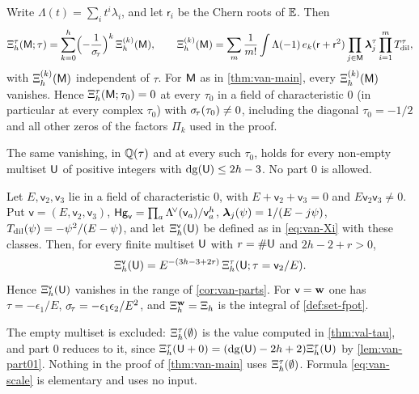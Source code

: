 \begin{cor}\label{cor:van-spec}
Write $\Lambda(t)=\sum_i t^i\lambda_i$, and let $\mathsf{r}_i$ be the Chern roots of $\mathbb{E}$. Then
\[
\Xi^{\tau}_h(\mathsf{M};\tau)=\sum_{k=0}^h\Bigl(-\frac{1}{\sigma_{\!\tau}}\Bigr)^{k}\,\Xi^{(k)}_h(\mathsf{M}),\qquad
\Xi^{(k)}_h(\mathsf{M})=\sum_m\frac{1}{m!}\int\Lambda(-1)\,e_k(\mathsf{r}+\mathsf{r}^2)\prod_{j\in\mathsf{M}}\boldsymbol{\lambda}^{\tau}_j\prod_{i=1}^mT_{\mathrm{dil}}^{\tau},
\]
with $\Xi^{(k)}_h(\mathsf{M})$ independent of $\tau$. For $\mathsf{M}$ as in \cref{thm:van-main}, every $\Xi^{(k)}_h(\mathsf{M})$ vanishes. Hence $\Xi^{\tau}_h(\mathsf{M};\tau_0)=0$ at every $\tau_0$ in a field of characteristic $0$ (in particular at every complex $\tau_0$) with $\sigma_{\!\tau}(\tau_0)\neq 0$, including the diagonal $\tau_0=-1/2$ and all other zeros of the factors $\Pi_k$ used in the proof.
\end{cor}

\begin{cor}\label{cor:van-parts}
The same vanishing, in $\mathbb{Q}(\tau)$ and at every such $\tau_0$, holds for every non-empty multiset $\mathsf{U}$ of positive integers with $\mathrm{dg}(\mathsf{U})\leq 2h-3$. No part $0$ is allowed.
\end{cor}

\begin{cor}\label{cor:van-scale}
Let $E,\mathsf{v}_2,\mathsf{v}_3$ lie in a field of characteristic $0$, with $E+\mathsf{v}_2+\mathsf{v}_3=0$ and $E\mathsf{v}_2\mathsf{v}_3\neq 0$. Put $\mathsf{v}=(E,\mathsf{v}_2,\mathsf{v}_3)$, $\mathsf{Hg}_{\mathsf{v}}=\prod_a\Lambda^{\!\vee}(\mathsf{v}_a)/\mathsf{v}_a^h$, $\boldsymbol{\lambda}_j(\psi)=1/(E-j\psi)$, $T_{\mathrm{dil}}(\psi)=-\psi^2/(E-\psi)$, and let $\Xi^{\mathsf{v}}_h(\mathsf{U})$ be defined as in \eqref{eq:van-Xi} with these classes. Then, for every finite multiset $\mathsf{U}$ with $r=\#\mathsf{U}$ and $2h-2+r>0$,
\begin{equation}\label{eq:van-scale}
\Xi^{\mathsf{v}}_h(\mathsf{U})=E^{-(3h-3+2r)}\,\Xi^{\tau}_h(\mathsf{U};\tau=\mathsf{v}_2/E).
\end{equation}
Hence $\Xi^{\mathsf{v}}_h(\mathsf{U})$ vanishes in the range of \cref{cor:van-parts}. For $\mathsf{v}=\mathbf{w}$ one has $\tau=-\epsilon_1/E$, $\sigma_{\!\tau}=-\epsilon_1\epsilon_2/E^2$, and $\Xi^{\mathbf{w}}_h=\Xi_h$ is the integral of \cref{def:set-fpot}.
\end{cor}

\begin{rmk}
The empty multiset is excluded: $\Xi^{\tau}_h(\emptyset)$ is the value computed in \cref{thm:val-tau}, and part $0$ reduces to it, since $\Xi^{\tau}_h(\mathsf{U}+0)=(\mathrm{dg}(\mathsf{U})-2h+2)\Xi^{\tau}_h(\mathsf{U})$ by \cref{lem:van-part01}. Nothing in the proof of \cref{thm:van-main} uses $\Xi^{\tau}_h(\emptyset)$. Formula \eqref{eq:van-scale} is elementary and uses no input.
\end{rmk}

